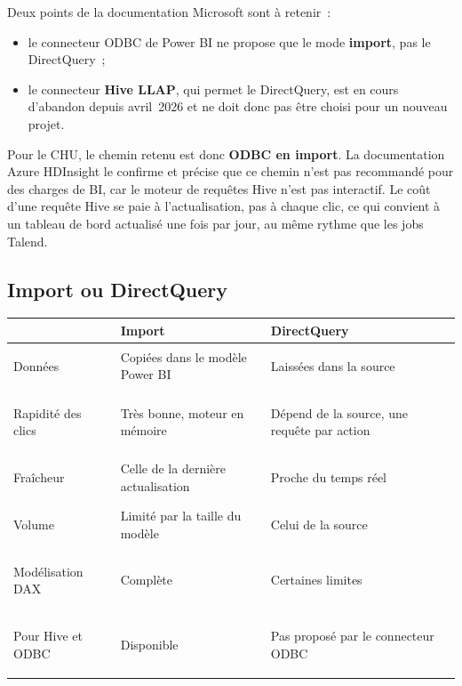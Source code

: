 \vspace{0.2cm}

\noindent Deux points de la documentation Microsoft sont à retenir~:
\begin{itemize}
	\item le connecteur ODBC de Power BI ne propose que le mode \textbf{import}, pas le DirectQuery~;
	\item le connecteur \textbf{Hive LLAP}, qui permet le DirectQuery, est en cours d'abandon depuis avril~2026 et ne doit donc pas être choisi pour un nouveau projet.
\end{itemize}

\noindent Pour le CHU, le chemin retenu est donc \textbf{ODBC en import}. La documentation Azure HDInsight le confirme et précise que ce chemin n'est pas recommandé pour des charges de BI, car le moteur de requêtes Hive n'est pas interactif. Le coût d'une requête Hive se paie à l'actualisation, pas à chaque clic, ce qui convient à un tableau de bord actualisé une fois par jour, au même rythme que les jobs Talend.

\subsection{Import ou DirectQuery}

\begin{center}
\small
\begin{tabularx}{\textwidth}{>{\bfseries\raggedright\arraybackslash}p{2.6cm} >{\raggedright\arraybackslash}X >{\raggedright\arraybackslash}X}
\toprule
 & Import & DirectQuery \\
\midrule
Données & Copiées dans le modèle Power BI & Laissées dans la source \\
Rapidité des clics & Très bonne, moteur en mémoire & Dépend de la source, une requête par action \\
Fraîcheur & Celle de la dernière actualisation & Proche du temps réel \\
Volume & Limité par la taille du modèle & Celui de la source \\
Modélisation DAX & Complète & Certaines limites \\
Pour Hive et ODBC & Disponible & Pas proposé par le connecteur ODBC \\
\bottomrule
\end{tabularx}
\end{center}

